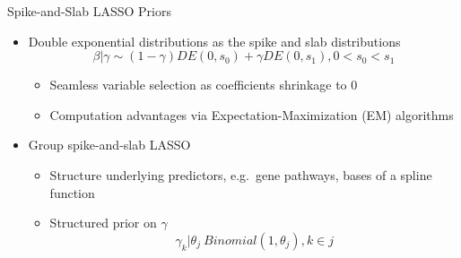 \documentclass[
  ignorenonframetext,
  aspectratio=169]{beamer}
\providecommand{\tightlist}{%
  \setlength{\itemsep}{0pt}\setlength{\parskip}{0pt}}
\begin{document}
\begin{frame}{Spike-and-Slab LASSO Priors}
\protect\hypertarget{spike-and-slab-lasso-priors}{}
\begin{itemize}
\tightlist
\item
  Double exponential distributions as the spike and slab distributions
  \[\beta|\gamma \sim (1-\gamma)DE(0, s_0) + \gamma DE(0, s_1), 0 < s_0 < s_1\]

  \begin{itemize}
  \tightlist
  \item
    Seamless variable selection as coefficients shrinkage to 0
  \item
    Computation advantages via Expectation-Maximization (EM) algorithms
  \end{itemize}
\item
  Group spike-and-slab LASSO

  \begin{itemize}
  \tightlist
  \item
    Structure underlying predictors, e.g.~gene pathways, bases of a
    spline function
  \item
    Structured prior on \(\gamma\) \[
    \gamma_k | \theta_j ~ Binomial(1, \theta_j), k \in j
    \]
  \end{itemize}
\end{itemize}
\end{frame}
\end{document}
